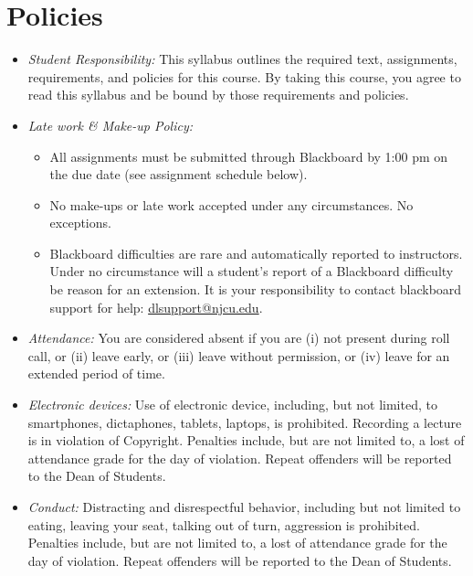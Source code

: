 \documentclass[11pt,article,oneside]{memoir}
\begin{document}
\section{Policies}

\begin{itemize}

\item \textit{Student Responsibility:} This syllabus outlines the required text, assignments, requirements, and policies for this course. By taking this course, you agree to read this syllabus and be bound by those requirements and policies. 

\item \textit{Late work \& Make-up Policy:} 
\begin{itemize}
\item All assignments must be submitted through Blackboard by 1:00 pm on the due date (see assignment schedule below).
\item  No make-ups or late work accepted under any circumstances. No exceptions. 
\item Blackboard difficulties are rare and automatically reported to instructors. Under no circumstance will a student's report of a Blackboard difficulty be reason for an extension. It is your responsibility to contact blackboard support for help: \href{dlsupport@njcu.edu}{dlsupport@njcu.edu}. 

\end{itemize}

\item \textit{Attendance:} You are considered absent if you are (i) not present during roll call, or (ii) leave early, or (iii) leave without permission, or (iv) leave for an extended period of time.

\item \textit{Electronic devices:} Use of electronic device, including, but not limited, to smartphones, dictaphones, tablets, laptops, is prohibited. Recording a lecture is in violation of Copyright. Penalties include, but are not limited to, a lost of attendance grade for the day of violation. Repeat offenders will be reported to the Dean of Students. 

\item \textit{Conduct:} Distracting and disrespectful behavior, including but not limited to eating, leaving your seat, talking out of turn, aggression is prohibited. Penalties include, but are not limited to, a lost of attendance grade for the day of violation. Repeat offenders will be reported to the Dean of Students. 


\end{itemize}
\end{document}
